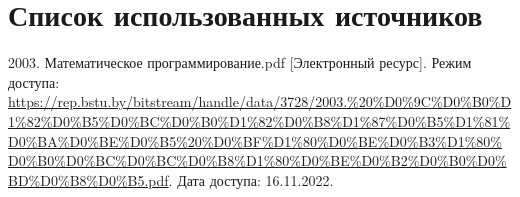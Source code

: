 \newpage

\begingroup
  \section*{Список использованных источников}

  \renewcommand{\addcontentsline}[3]{}%
  \renewcommand{\section}[2]{}%

  \begin{thebibliography}{}
    2003. Математическое программирование.pdf
    [Электронный ресурс].
    Режим доступа: \url{https://rep.bstu.by/bitstream/handle/data/3728/2003.%20%D0%9C%D0%B0%D1%82%D0%B5%D0%BC%D0%B0%D1%82%D0%B8%D1%87%D0%B5%D1%81%D0%BA%D0%BE%D0%B5%20%D0%BF%D1%80%D0%BE%D0%B3%D1%80%D0%B0%D0%BC%D0%BC%D0%B8%D1%80%D0%BE%D0%B2%D0%B0%D0%BD%D0%B8%D0%B5.pdf}.
    Дата доступа: 16.11.2022.
  \end{thebibliography}
\endgroup


\begingroup
  \section*{Литература, чтобы писать в \LaTeX}
  \addcontentsline{toc}{section}{Литература, чтобы писать в LaTeX}

  \renewcommand{\addcontentsline}[3]{}%
  \renewcommand{\section}[2]{}%

